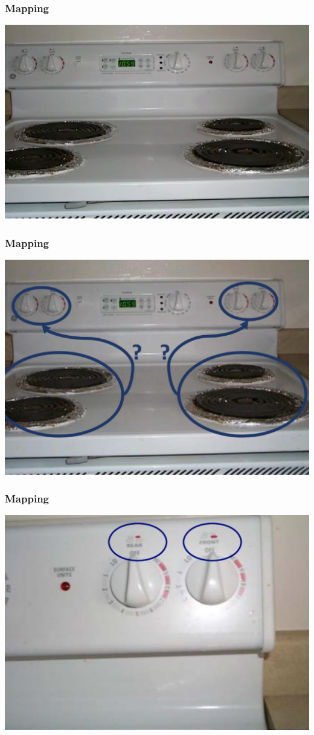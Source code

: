\documentclass{beamer}
\begin{document}
\begin{frame}
\frametitle{Mapping}
\centering
\includegraphics[width=0.9\linewidth]{map3}
\end{frame}

\begin{frame}
\frametitle{Mapping}
\centering
\includegraphics[width=0.8\linewidth]{map4}
\end{frame}

\begin{frame}
\frametitle{Mapping}
\centering
\includegraphics[width=0.8\linewidth]{map5}
\end{frame}
\end{document}
